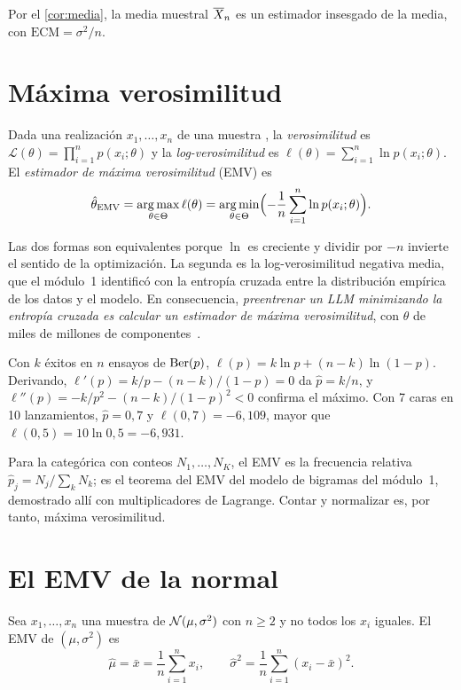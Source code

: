 Por el \cref{cor:media}, la media muestral $\overline{X}_n$ es un estimador insesgado de la media, con $\mathrm{ECM}=\sigma^{2}/n$.

\section{Máxima verosimilitud}

\begin{definicion}\label{def:emv}
Dada una realización $x_1,\dots,x_n$ de una muestra \iid, la \emph{verosimilitud} es $\mathcal{L}(\theta)=\prod_{i=1}^{n}p(x_i;\theta)$ y la \emph{log-verosimilitud} es $\ell(\theta)=\sum_{i=1}^{n}\ln p(x_i;\theta)$. El \emph{estimador de máxima verosimilitud} (EMV) es
\[
\hat\theta_{\mathrm{EMV}}=\operatorname*{arg\,max}_{\theta\in\Theta}\ell(\theta)=\operatorname*{arg\,min}_{\theta\in\Theta}\Bigl(-\frac1n\sum_{i=1}^{n}\ln p(x_i;\theta)\Bigr).
\]
\end{definicion}

Las dos formas son equivalentes porque $\ln$ es creciente y dividir por $-n$ invierte el sentido de la optimización. La segunda es la log-verosimilitud negativa media, que el módulo~1 identificó con la entropía cruzada entre la distribución empírica de los datos y el modelo. En consecuencia, \emph{preentrenar un LLM minimizando la entropía cruzada es calcular un estimador de máxima verosimilitud}, con $\theta$ de miles de millones de componentes~\cite[§8.3]{mml}.

\begin{ejemplo}[Bernoulli]\label{ej:emv-bernoulli}
Con $k$ éxitos en $n$ ensayos de $\operatorname{Ber}(p)$, $\ell(p)=k\ln p+(n-k)\ln(1-p)$. Derivando, $\ell'(p)=k/p-(n-k)/(1-p)=0$ da $\hat p=k/n$, y $\ell''(p)=-k/p^{2}-(n-k)/(1-p)^{2}<0$ confirma el máximo. Con 7 caras en 10 lanzamientos, $\hat p=0{,}7$ y $\ell(0{,}7)=-6{,}109$, mayor que $\ell(0{,}5)=10\ln 0{,}5=-6{,}931$.
\end{ejemplo}

Para la categórica con conteos $N_1,\dots,N_K$, el EMV es la frecuencia relativa $\hat p_j=N_j/\sum_k N_k$; es el teorema del EMV del modelo de bigramas del módulo~1, demostrado allí con multiplicadores de Lagrange. Contar y normalizar es, por tanto, máxima verosimilitud.

\section{El EMV de la normal}

\begin{teorema}\label{teo:emv-normal}
Sea $x_1,\dots,x_n$ una muestra de $\mathcal{N}(\mu,\sigma^{2})$ con $n\ge 2$ y no todos los $x_i$ iguales. El EMV de $(\mu,\sigma^{2})$ es
\[
\hat\mu=\bar x=\frac1n\sum_{i=1}^{n}x_i,\qquad \hat\sigma^{2}=\frac1n\sum_{i=1}^{n}(x_i-\bar x)^{2}.
\]
\end{teorema}

